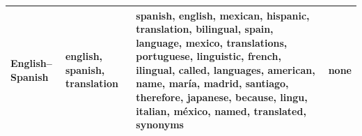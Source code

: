 \begin{xltabular}{\textwidth}{@{}>{\raggedright\arraybackslash}p{1.9cm}>{\raggedright\arraybackslash}p{2.3cm}>{\raggedright\arraybackslash}X>{\raggedright\arraybackslash}p{2.9cm}@{}}
English--Spanish & english, spanish, translation & spanish, english, mexican, hispanic, translation, bilingual, spain, language, mexico, translations, portuguese, linguistic, french, ilingual, called, languages, american, name, maría, madrid, santiago, therefore, japanese, because, lingu, italian, méxico, named, translated, synonyms & none \\
\bottomrule
\end{xltabular}
